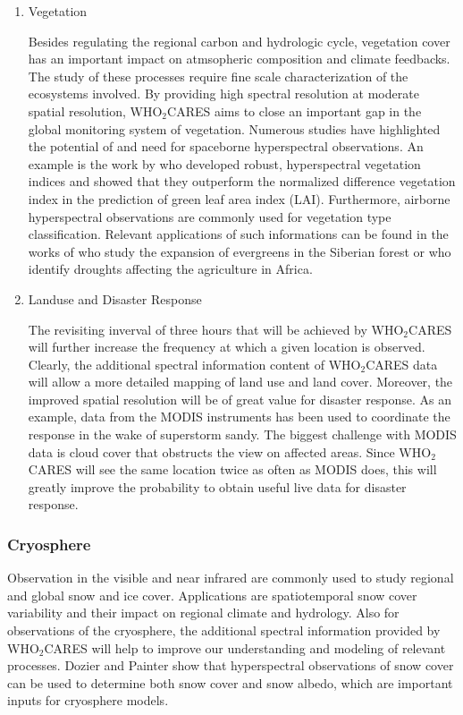 \documentclass{scrartcl}
\newcommand{\whocares}{WHO$_2$CARES }
\begin{document}
\begin{enumerate}
\item Vegetation
\label{sec:org772825a}

Besides regulating the regional carbon and hydrologic cycle, vegetation cover
has an important impact on atmsopheric composition and climate feedbacks. The
study of these processes require fine scale characterization of the
ecosystems involved. By providing high spectral resolution at moderate spatial
resolution, \whocares aims to close an important gap in the global monitoring
system of vegetation. Numerous studies have highlighted the potential of and
need for spaceborne hyperspectral observations. An example is the work by
\citet{haboudane} who developed robust, hyperspectral vegetation indices and
showed that they outperform the normalized difference vegetation index in the
prediction of green leaf area index (LAI). Furthermore, airborne hyperspectral
observations are commonly used for vegetation type classification. Relevant
applications of such informations can be found in the works of \citet{he}
who study the expansion of evergreens in the Siberian forest or \citet{winkler} 
who identify droughts affecting the agriculture in Africa.

\item Landuse and Disaster Response
\label{sec:org2a8ca68}

The revisiting inverval of three hours that will be achieved by \whocares
will further increase the frequency at which a given location is observed.
Clearly, the additional spectral information content of \whocares data will
allow a more detailed mapping of land use and land cover. Moreover, the
improved spatial resolution will be of great value for disaster response. As
an example, data from the MODIS instruments has been used to coordinate the
response in the wake of superstorm sandy. The biggest challenge with MODIS
data is cloud cover that obstructs the view on affected areas. Since
\whocares will see the same location twice as often as MODIS does, this will
greatly improve the probability to obtain useful live data for disaster
response.
\end{enumerate}

\subsubsection{Cryosphere}
\label{sec:orgf2dd4f7}

Observation in the visible and near infrared are commonly used to study regional and
global snow and ice cover. Applications are spatiotemporal snow cover variability
\citep{dariane, zhuo} and their impact on regional climate and hydrology. Also for 
observations of the cryosphere, the additional spectral information provided by
\whocares will help to improve our understanding and modeling of relevant processes.
Dozier and Painter show that hyperspectral observations of snow cover can be used
to determine both snow cover and snow albedo, which are important inputs for
cryosphere models.
\end{document}

